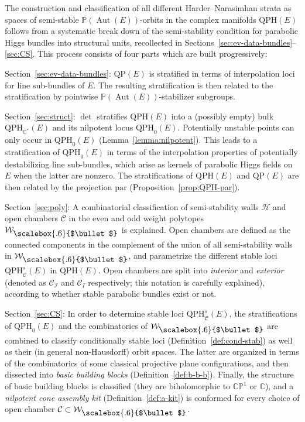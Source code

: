 \documentclass[10pt,a4paper]{amsart}
\newcommand{\field}[1]{\ensuremath{\mathbb{#1}}}
\newcommand{\CC}{\field{C}}
\newcommand{\PP}{\field{P}}
\newcommand\sbul[1][.6]{\mathbin{\vcenter{\hbox{\scalebox{#1}{$\bullet$}}}}}
\newcommand{\qC}{\mathcal{C}}
\newcommand{\qH}{\mathcal{H}}
\newcommand{\qI}{\mathcal{I}}
\newcommand{\qW}{\mathcal{W}}
\DeclareMathOperator{\Aut}{Aut}
\numberwithin{equation}{section}
\begin{document}
The construction and classification of all different Harder--Narasimhan strata as spaces of semi-stable $\PP(\Aut(E))$-orbits in the complex manifolds $\mathrm{QPH}(E)$ follows from a systematic break down of the semi-stability condition for parabolic Higgs bundles into structural units, recollected in Sections~\ref{sec:ev-data-bundles}--\ref{sec:CS}. This process consists of four parts which are built progressively:

Section~\ref{sec:ev-data-bundles}:
$\mathrm{QP}(E)$ is stratified in terms of interpolation loci for line sub-bundles of $E$. The resulting stratification is then related to the stratification by pointwise $\PP(\Aut(E))$-stabilizer subgroups.

Section~\ref{sec:struct}:
$\det$ stratifies $\mathrm{QPH}(E)$ into a (possibly empty) bulk $\mathrm{QPH}_{\CC^{*}}(E)$ and its nilpotent locus $\mathrm{QPH}_{0}(E)$. Potentially unstable points can only occur in $\mathrm{QPH}_{0}(E)$ (Lemma~\ref{lemma:nilpotent}). This leads to a stratification of $\mathrm{QPH}_{0}(E)$ in terms of the interpolation properties of potentially destabilizing line sub-bundles, which arise as kernels of parabolic Higgs fields on $E$ when the latter are nonzero. The stratifications of $\mathrm{QPH}(E)$ and $\mathrm{QP}(E)$ are then related by the projection $\mathrm{par}$ (Proposition~\ref{prop:QPH-par}).

Section~\ref{sec:poly}:
A combinatorial classification of semi-stability walls $\qH$ and open chambers $\qC$ in the even and odd weight polytopes $\qW_{\sbul}$ is explained. Open chambers are defined as the connected components in the complement of the union of all semi-stability walls in $\qW_{\sbul}$, and parametrize the different stable loci $\mathrm{QPH}^{s}_{\qC}(E)$ in $\mathrm{QPH}(E)$. Open chambers are split into \textit{interior} and \textit{exterior} (denoted as $\qC_{\qI}$ and $\qC_{I}$ respectively; this notation is carefully explained), according to whether stable parabolic bundles exist or not.

Section~\ref{sec:CS}: In order to determine stable loci $\mathrm{QPH}^{s}_{\qC}(E)$, the stratifications of $\mathrm{QPH}_{0}(E)$ and the combinatorics of $\qW_{\sbul}$ are combined to classify conditionally stable loci (Definition~\ref{def:cond-stab}) as well as their (in general non-Hausdorff) orbit spaces. The latter are organized in terms of the combinatorics of some classical projective plane configurations, and then dissected into \textit{basic building blocks} (Definition~\ref{def:b-b-b}). Finally, the structure of basic building blocks is classified (they are biholomorphic to $\CC\PP^{1}$ or $\CC$), and a \textit{nilpotent cone assembly kit} (Definition~\ref{def:a-kit}) is conformed for every choice of open chamber $\qC\subset \qW_{\sbul}$.
\end{document}
